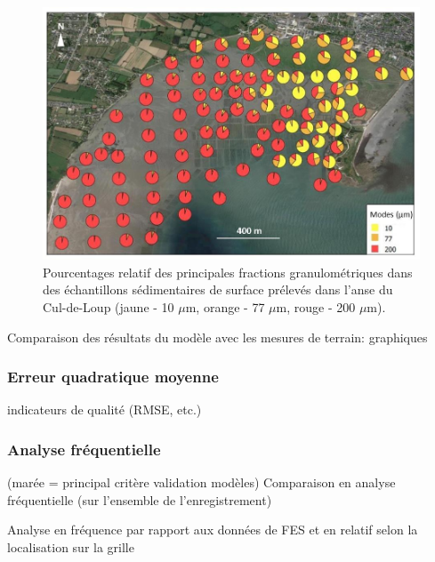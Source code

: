 \documentclass[10pt,a4paper,titlepage]{article}
\begin{document}
\begin{figure}[!h]
    \centering
    \includegraphics[width=0.8\linewidth]{../images/sed_adcl_protec.png}
    \caption[Sédiment de l'anse du Cul-de-Loup]{Pourcentages relatif des principales fractions granulométriques dans des échantillons sédimentaires de surface prélevés dans l'anse du Cul-de-Loup (jaune - 10 $\mu$m, orange - 77 $\mu$m, rouge - 200 $\mu$m).}
    \label{fig:sed-adcl}
\end{figure}




Comparaison des résultats du modèle avec les mesures de terrain: graphiques

\subsubsection{Erreur quadratique moyenne}
indicateurs de qualité (RMSE, etc.)

\subsubsection{Analyse fréquentielle}
(marée = principal critère validation modèles)
Comparaison en analyse fréquentielle (sur l'ensemble de l'enregistrement)

Analyse en fréquence par rapport aux données de FES et en relatif selon la localisation sur la grille
\end{document}
